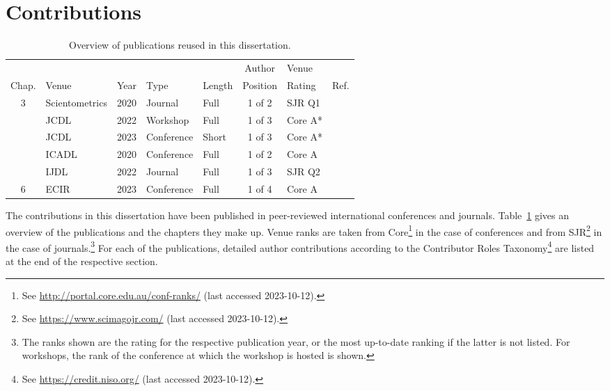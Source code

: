 \section{Contributions}

\begin{table}[tb]
\centering
  \caption{Overview of publications reused in this dissertation.}
  \label{tab:primarypublicationoverview}
  \begin{tabular}{cllllclr}
    \hline
    \ & \ & \ & \ & \ & Author & Venue & \ \\
    Chap. & Venue & Year & Type & Length & Position & Rating & Ref. \\
    \hline
    3 & Scientometrics & 2020 & Journal & Full & 1 of 2 & SJR Q1 & \cite{Saier2020} \\
    \arrayrulecolor{lightgrey}\cline{1-8}
    \multirow{2}{*}{4} & JCDL & 2022 & Workshop & Full & 1 of 3 & Core A* & \cite{Saier2022ULITE} \\
    \ & JCDL & 2023 & Conference & Short & 1 of 3 & Core A* & \cite{Saier2023unarXive} \\
    \arrayrulecolor{lightgrey}\cline{1-8}
    \multirow{2}{*}{5} & ICADL & 2020 & Conference & Full & 1 of 2 & Core A & \cite{Saier2020xling} \\
    \ & IJDL & 2022 & Journal & Full & 1 of 3 & SJR Q2 & \cite{Saier2021} \\
    \arrayrulecolor{lightgrey}\cline{1-8}\arrayrulecolor{black}
    6 & ECIR & 2023 & Conference & Full & 1 of 4 & Core A & \cite{Saier2023hyperpie} \\
    \hline
    \end{tabular}
\end{table}

The contributions in this dissertation have been published in peer-reviewed international conferences and journals. Table~\ref{tab:primarypublicationoverview} gives an overview of the publications and the chapters they make up. Venue ranks are taken from Core\footnote{See \url{http://portal.core.edu.au/conf-ranks/} (last accessed 2023-10-12).} in the case of conferences and from SJR\footnote{See \url{https://www.scimagojr.com/} (last accessed 2023-10-12).} in the case of journals.\footnote{The ranks shown are the rating for the respective publication year, or the most up-to-date ranking if the latter is not listed. For workshops, the rank of the conference at which the workshop is hosted is shown.} For each of the publications, detailed author contributions according to the Contributor Roles Taxonomy\footnote{See \url{https://credit.niso.org/} (last accessed 2023-10-12).} are listed at the end of the respective section.

